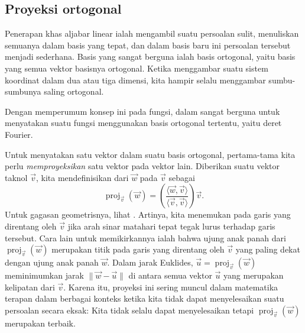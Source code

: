 \subsection{Proyeksi ortogonal}

Penerapan khas aljabar linear ialah mengambil suatu persoalan sulit,
menuliskan semuanya dalam basis yang tepat, dan dalam basis baru ini persoalan tersebut
menjadi sederhana. Basis yang sangat berguna ialah basis ortogonal,
yaitu basis yang semua vektor basisnya ortogonal. Ketika menggambar suatu
sistem koordinat dalam dua atau tiga dimensi, kita hampir selalu menggambar sumbu-sumbunya
saling ortogonal.

Dengan memperumum konsep ini pada fungsi,
dalam  sangat berguna untuk menyatakan suatu
fungsi menggunakan basis ortogonal tertentu, yaitu deret Fourier.

Untuk menyatakan satu vektor dalam suatu basis ortogonal, pertama-tama kita perlu
\emph{memproyeksikan} satu vektor pada vektor lain.
Diberikan suatu vektor taknol $\vec{v}$, kita mendefinisikan
\emph{}
dari $\vec{w}$ pada $\vec{v}$ sebagai
\begin{equation*}
\operatorname{proj}_{\vec{v}}(\vec{w})
=
\left(
\frac{\langle \vec{w} , \vec{v} \rangle}{ \langle \vec{v} , \vec{v} \rangle}
\right)
\vec{v} .
\end{equation*}
Untuk gagasan geometrisnya, lihat . Artinya, kita
menemukan  pada garis yang direntang oleh $\vec{v}$ jika
arah sinar matahari
tepat tegak lurus terhadap garis tersebut.
Cara lain untuk memikirkannya ialah bahwa ujung anak panah dari
$\operatorname{proj}_{\vec{v}}(\vec{w})$ merupakan titik pada garis
yang direntang oleh $\vec{v}$ yang paling dekat dengan ujung anak panah $\vec{w}$.
Dalam jarak Euklides,
$\vec{u} = \operatorname{proj}_{\vec{v}}(\vec{w})$ meminimumkan
jarak
$\lVert \vec{w} - \vec{u} \rVert$ di antara semua vektor $\vec{u}$ yang merupakan
kelipatan dari $\vec{v}$.
Karena itu, proyeksi ini sering muncul dalam matematika
terapan dalam berbagai konteks ketika kita tidak dapat menyelesaikan suatu persoalan
secara eksak: Kita tidak selalu dapat menyelesaikan
tetapi $\operatorname{proj}_{\vec{v}}(\vec{w})$ merupakan  terbaik.

\begin{myfig}
\capstart
{}
\caption{Proyeksi ortogonal.\label{vec-orthoproj:fig}}
\end{myfig}

